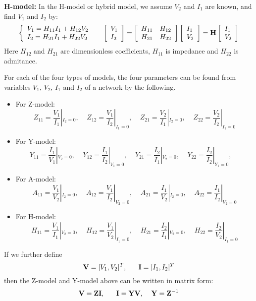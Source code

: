 {\bf H-model:} In the H-model or hybrid model, we assume $V_2$ and $I_1$ are 
known, and find $V_1$ and $I_2$ by:
\[\left\{ \begin{array}{l} 
	V_1=H_{11}I_1+H_{12}V_2 \\
	I_2=H_{21}I_1+H_{22}V_2 \end{array} \right.\;\;\;\;\;
	\left[ \begin{array}{l} V_1 \\ I_2\end{array} \right]=
	\left[ \begin{array}{ll} H_{11} & H_{12}\\H_{21} & H_{22}\end{array}\right]
	\left[ \begin{array}{l} I_1 \\ V_2\end{array} \right]
	={\bf H}\left[ \begin{array}{l} I_1 \\ V_2\end{array} \right]
\]
Here $H_{12}$ and $H_{21}$ are dimensionless coefficients, $H_{11}$ is impedance
and $H_{22}$ is admitance. 

For each of the four types of models, the four parameters can be found
from variables $V_1$, $V_2$, $I_1$ and $I_2$ of a network by the following.
\begin{itemize}
\item For Z-model:
\[	Z_{11}=\frac{V_1}{I_1}|_{I_2=0},\;\;\;\;
	Z_{12}=\frac{V_1}{I_2}|_{I_1=0},\;\;\;\;
	Z_{21}=\frac{V_2}{I_1}|_{I_2=0},\;\;\;\;
	Z_{22}=\frac{V_2}{I_2}|_{I_1=0}
\]
\item For Y-model:
\[	Y_{11}=\frac{I_1}{V_1}|_{V_2=0},\;\;\;\;
	Y_{12}=\frac{I_1}{I_2}|_{V_1=0},\;\;\;\;
	Y_{21}=\frac{I_2}{I_1}|_{V_2=0},\;\;\;\;
	Y_{22}=\frac{I_2}{I_2}|_{Y_1=0},\;\;\;\;
\]
\item For A-model:
\[	A_{11}=\frac{V_1}{V_2}|_{I_2=0},\;\;\;\;
	A_{12}=\frac{V_1}{I_2}|_{V_2=0},\;\;\;\;
	A_{21}=\frac{I_1}{V_2}|_{I_2=0},\;\;\;\;
	A_{22}=\frac{I_1}{I_2}|_{V_2=0}
\]
\item For H-model:
\[	H_{11}=\frac{V_1}{I_1}|_{V_2=0},\;\;\;\;
	H_{12}=\frac{V_1}{V_2}|_{I_1=0},\;\;\;\;
	H_{21}=\frac{I_2}{I_1}|_{V_2=0},\;\;\;\;
	H_{22}=\frac{I_2}{V_2}|_{I_1=0}
\]
\end{itemize}

If we further define
\[	{\bf V}=[V_1, V_2]^T,\;\;\;\;\;\;{\bf I}=[I_1, I_2]^T	\]
then the Z-model and Y-model above can be written in matrix form:
\[ {\bf V}={\bf Z} {\bf I},\;\;\;\;\;\;{\bf I}={\bf Y} {\bf V},\;\;\;\;
	{\bf Y}={\bf Z}^{-1}		\]

